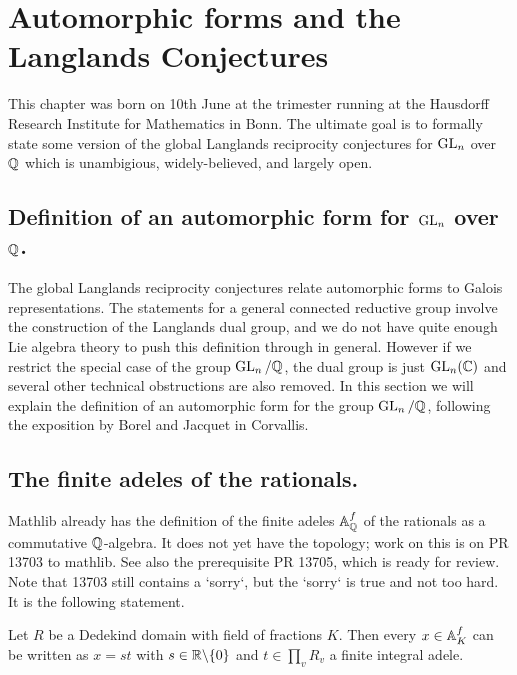 \chapter{Automorphic forms and the Langlands Conjectures}

This chapter was born on 10th June at the trimester running at the Hausdorff Research Institute for
Mathematics in Bonn. The ultimate goal is to formally state some version of the global Langlands
reciprocity conjectures for $\operatorname{GL}_n$ over $\mathbb{Q}$ which is unambigious, widely-believed, and largely open.

\section[Definition of an automorphic form]{Definition of an automorphic form for $\operatorname{GL}_n$ over $\mathbb{Q}$.}

The global Langlands reciprocity conjectures relate automorphic forms to Galois representations.
The statements for a general connected reductive group involve the construction of the Langlands
dual group, and we do not have quite enough Lie algebra theory to push this definition through
in general. However if we restrict the special case of the group $\operatorname{GL}_n/\mathbb{Q}$, the dual group
is just $\operatorname{GL}_n(\mathbb{C})$ and several other technical obstructions are also removed. In this
section we will explain the definition of an automorphic form for the group $\operatorname{GL}_n/\mathbb{Q}$, following
the exposition by Borel and Jacquet in Corvallis.

\section{The finite adeles of the rationals.}

Mathlib already has the definition of the finite adeles $\mathbb{A}_{\mathbb{Q}}^f$ of the rationals as a
commutative $\mathbb{Q}$-algebra. It does not yet have the topology; work on this is on PR 13703 to mathlib.
See also the prerequisite PR 13705, which is ready for review. Note that 13703 still contains a
`sorry`, but the `sorry` is true and not too hard. It is the following statement.

\begin{theorem}
    \label{FiniteAdeleRing.topology}
    \leanok
  Let $R$ be a Dedekind domain with field of fractions $K$. Then every $x\in\mathbb{A}_K^f$ can
  be written as $x=st$ with $s\in\mathbb{R}\backslash\{0\}$ and $t\in\prod_v R_v$ a finite integral adele.
\end{theorem}

